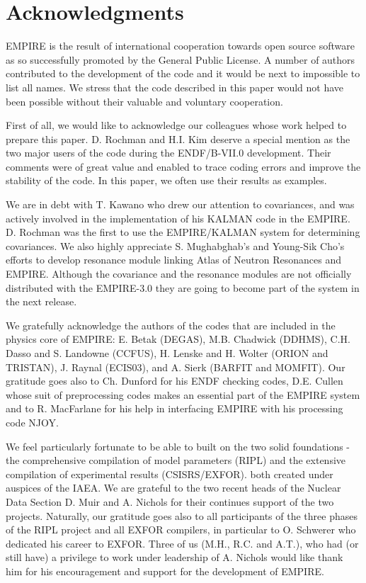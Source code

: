 \documentclass[twocolumn,amsmath,amssymb,10pt,groupedaddress,a4paper]{revtex4}
\begin{document}
\section*{Acknowledgments}

EMPIRE is the result of international cooperation towards open source software as so successfully promoted by the General Public License. A number of authors contributed to the development of the code and it would be next to impossible to list all names. We stress that the code described in this paper would not have been possible without their valuable and voluntary cooperation.

First of all, we would like to acknowledge our colleagues whose work helped to prepare this paper. D. Rochman and H.I. Kim deserve a special mention as the two major users of the code during the ENDF/B-VII.0 development. Their comments were of great value and enabled to trace coding errors and improve the stability of the code. In this paper, we often use their results as examples.

We are in debt with
T. Kawano who drew our attention to covariances, and was actively involved in the implementation of his KALMAN code in the EMPIRE. D. Rochman was the first to use the EMPIRE/KALMAN system for determining covariances. We also highly appreciate  S. Mughabghab's and Young-Sik Cho's efforts to develop resonance module linking Atlas of Neutron Resonances and EMPIRE. Although the covariance and the resonance modules are not officially distributed with the EMPIRE-3.0 they are going to become part of the system in the next release.

We gratefully acknowledge the authors of the codes that are included in the physics core of EMPIRE: E. Betak (DEGAS), M.B. Chadwick (DDHMS), C.H. Dasso and S. Landowne (CCFUS), H. Lenske and H. Wolter (ORION and TRISTAN), J. Raynal (ECIS03), and A. Sierk (BARFIT and MOMFIT). Our gratitude goes also to Ch. Dunford for his ENDF checking codes, D.E. Cullen whose suit of preprocessing codes makes an essential part of the EMPIRE system and to R. MacFarlane for his help in interfacing EMPIRE with his processing code NJOY.

We feel particularly fortunate to be able to built on the two solid foundations - the comprehensive compilation of model parameters (RIPL) and the extensive compilation of experimental results (CSISRS/EXFOR). both created under auspices of the IAEA.  We are grateful to the two recent heads of the Nuclear Data Section D. Muir and A. Nichols for their continues support of the two projects. Naturally, our gratitude goes also to all participants of the three phases of the RIPL project and all EXFOR compilers, in particular to O. Schwerer who dedicated his career to EXFOR. Three of us (M.H., R.C. and A.T.), who  had (or still have) a privilege to work under leadership of A. Nichols would like thank him for his encouragement and support for the development of EMPIRE.
\end{document}
